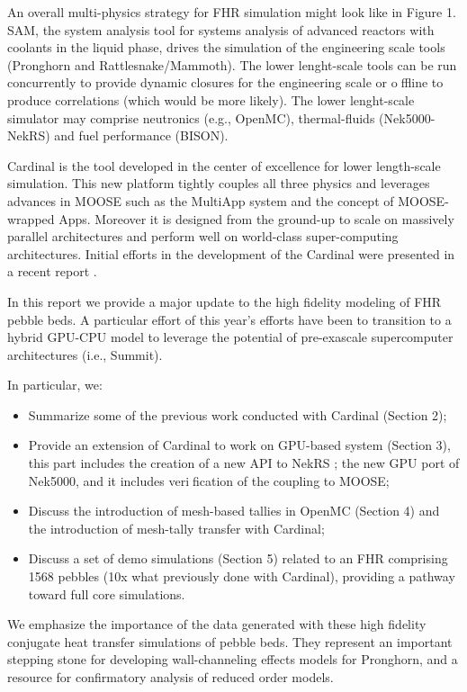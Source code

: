 An overall multi-physics strategy for FHR simulation might look like in Figure 1. SAM, the system analysis tool for systems analysis of advanced reactors with coolants in the liquid phase, drives the simulation of the engineering scale tools (Pronghorn and Rattlesnake/Mammoth). The lower lenght-scale tools can be run concurrently to provide dynamic closures for the engineering scale or offline to produce correlations (which would be more likely). The lower lenght-scale simulator may comprise neutronics (e.g., OpenMC), thermal-fluids (Nek5000-NekRS) and fuel performance (BISON).

Cardinal is the tool developed in the center of excellence for
lower length-scale simulation. This new platform tightly couples all three physics and leverages advances in MOOSE \cite{gaston2009moose} such as the MultiApp system and the concept of MOOSE-wrapped Apps. Moreover it is designed from the ground-up to scale on massively parallel architectures and perform well on world-class
super-computing architectures. Initial efforts in the development of the Cardinal were presented in a recent report \cite{cardinal}.

In this report we provide a major update to the high fidelity modeling of FHR pebble beds. A particular effort of this year's efforts have been to transition to a hybrid GPU-CPU model to leverage the potential of pre-exascale supercomputer architectures (i.e., Summit).

In particular, we:
\begin{itemize}
\item Summarize some of the previous work conducted with Cardinal (Section 2);
\item Provide an extension of Cardinal to work on GPU-based system (Section 3), this part includes the creation of a new API to NekRS \cite{toward}; the new GPU port of Nek5000, and it includes  verification of the coupling to MOOSE;
\item Discuss the introduction of mesh-based tallies in OpenMC (Section 4) and the introduction of mesh-tally transfer with Cardinal;
\item Discuss a set of demo simulations (Section 5) related to an FHR comprising 1568 pebbles (10x what previously done with Cardinal), providing a pathway toward full core simulations.
\end{itemize}

We emphasize the importance of the data generated with these high fidelity conjugate heat transfer simulations of pebble beds. They represent an important stepping stone for developing wall-channeling effects models for Pronghorn, and a resource for confirmatory analysis of reduced order models.
